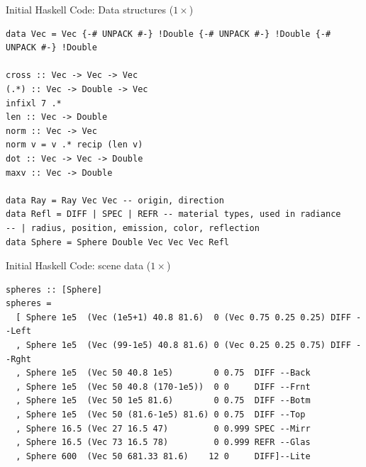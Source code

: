 \documentclass[8pt]{beamer}
\begin{document}
\begin{frame}[fragile]{Initial Haskell Code: Data structures ($1\times$)}
\begin{verbatim}
data Vec = Vec {-# UNPACK #-} !Double {-# UNPACK #-} !Double {-# UNPACK #-} !Double

cross :: Vec -> Vec -> Vec
(.*) :: Vec -> Double -> Vec
infixl 7 .*
len :: Vec -> Double
norm :: Vec -> Vec
norm v = v .* recip (len v)
dot :: Vec -> Vec -> Double
maxv :: Vec -> Double

data Ray = Ray Vec Vec -- origin, direction
data Refl = DIFF | SPEC | REFR -- material types, used in radiance
-- | radius, position, emission, color, reflection
data Sphere = Sphere Double Vec Vec Vec Refl
\end{verbatim}

\end{frame}

\begin{frame}[fragile]{Initial Haskell Code: scene data ($1\times$)}
\begin{verbatim}
spheres :: [Sphere]
spheres =
  [ Sphere 1e5  (Vec (1e5+1) 40.8 81.6)  0 (Vec 0.75 0.25 0.25) DIFF --Left
  , Sphere 1e5  (Vec (99-1e5) 40.8 81.6) 0 (Vec 0.25 0.25 0.75) DIFF --Rght
  , Sphere 1e5  (Vec 50 40.8 1e5)        0 0.75  DIFF --Back
  , Sphere 1e5  (Vec 50 40.8 (170-1e5))  0 0     DIFF --Frnt
  , Sphere 1e5  (Vec 50 1e5 81.6)        0 0.75  DIFF --Botm
  , Sphere 1e5  (Vec 50 (81.6-1e5) 81.6) 0 0.75  DIFF --Top
  , Sphere 16.5 (Vec 27 16.5 47)         0 0.999 SPEC --Mirr
  , Sphere 16.5 (Vec 73 16.5 78)         0 0.999 REFR --Glas
  , Sphere 600  (Vec 50 681.33 81.6)    12 0     DIFF]--Lite
\end{verbatim}

\end{frame}
\end{document}
